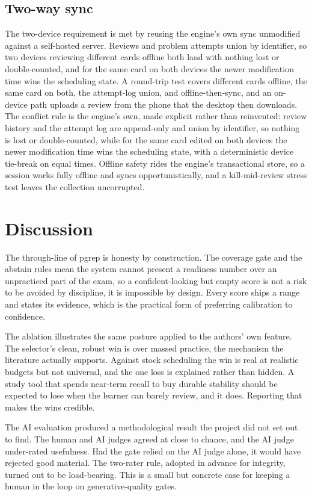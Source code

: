 \documentclass[11pt]{article}
\begin{document}
\subsection{Two-way sync}

The two-device requirement is met by reusing the engine's own sync unmodified against
a self-hosted server. Reviews and problem attempts union by identifier, so two devices
reviewing different cards offline both land with nothing lost or double-counted, and
for the same card on both devices the newer modification time wins the scheduling
state. A round-trip test covers different cards offline, the same card on both, the
attempt-log union, and offline-then-sync, and an on-device path uploads a review from
the phone that the desktop then downloads. The conflict rule is the engine's own, made
explicit rather than reinvented: review history and the attempt log are append-only and
union by identifier, so nothing is lost or double-counted, while for the same card
edited on both devices the newer modification time wins the scheduling state, with a
deterministic device tie-break on equal times. Offline safety rides the engine's
transactional store, so a session works fully offline and syncs opportunistically, and
a kill-mid-review stress test leaves the collection uncorrupted.

\section{Discussion}

The through-line of pgrep is honesty by construction. The coverage gate and the
abstain rules mean the system cannot present a readiness number over an unpracticed
part of the exam, so a confident-looking but empty score is not a risk to be avoided
by discipline, it is impossible by design. Every score ships a range and states its
evidence, which is the practical form of preferring calibration to confidence.

The ablation illustrates the same posture applied to the authors' own feature. The
selector's clean, robust win is over massed practice, the mechanism the literature
actually supports. Against stock scheduling the win is real at realistic budgets but
not universal, and the one loss is explained rather than hidden. A study tool that
spends near-term recall to buy durable stability should be expected to lose when the
learner can barely review, and it does. Reporting that makes the wins credible.

The AI evaluation produced a methodological result the project did not set out to
find. The human and AI judges agreed at close to chance, and the AI judge
under-rated usefulness. Had the gate relied on the AI judge alone, it would have
rejected good material. The two-rater rule, adopted in advance for integrity, turned
out to be load-bearing. This is a small but concrete case for keeping a human in the
loop on generative-quality gates.
\end{document}
